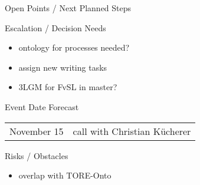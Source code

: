 \documentclass[]{kiesgrube}
\begin{document}
\begin{poster}
\begin{posterbox}[name=open,column=1,below=description]{Open Points / Next Planned Steps}
\end{posterbox}
\begin{posterbox}[name=escalation,column=1,below=open]{Escalation / Decision Needs}
\begin{itemize}
\item	ontology for processes needed?
\item	assign new writing tasks
\item	3LGM for FvSL in master?
\end{itemize}
\end{posterbox}
\begin{posterbox}[name=event,below=progress,]{Event Date Forecast}
\begin{tabulary}{\textwidth}{lL}
November 15	&call with Christian Kücherer\\	
\end{tabulary}
\end{posterbox}
\begin{posterbox}[name=event,below=event]{Risks / Obstacles}
\begin{itemize}
\item overlap with TORE-Onto
\end{itemize}
\end{posterbox}


\end{poster}
\end{document}
